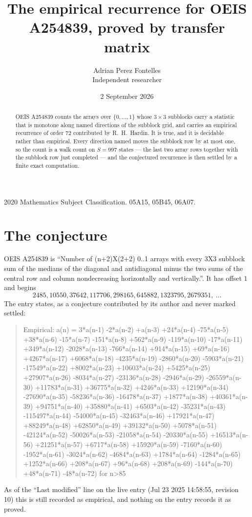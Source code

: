 \documentclass[11pt,a4paper]{article}
\title{The empirical recurrence for OEIS A254839, proved by transfer matrix}
\author{Adrian Perez Fontelles\\ \small Independent researcher}
\date{2 September 2026}
\theoremstyle{plain}
\theoremstyle{definition}
\begin{document}
\maketitle

\begin{abstract}
OEIS A254839 counts the arrays over $\{0,\dots,1\}$ whose $3\times3$ subblocks carry a
statistic that is monotone along named directions of the subblock grid, and carries an
empirical recurrence of order $72$ contributed by R.~H.~Hardin. It is true, and it is
decidable rather than empirical. Every direction named moves the subblock row by at most one,
so the count is a walk count on $S=997$ states --- the last two array rows together with the
subblock row just completed --- and the conjectured recurrence is then settled by a finite
exact computation.
\end{abstract}

\noindent\small 2020 Mathematics Subject Classification. 05A15, 05B45, 06A07.\normalsize

\section{The conjecture}

OEIS A254839 is ``Number of (n+2)X(2+2) 0..1 arrays with every 3X3 subblock sum of the medians of the diagonal and antidiagonal minus the two sums of the central row and column nondecreasing horizontally and vertically.''. It has offset $1$ and begins
\[
2485, 10550, 37642, 117706, 298165, 645882, 1323795, 2679351,\ \dots
\]
The entry states, as a conjecture contributed by its author and never marked settled:
\begin{quote}
Empirical: a(n) = 3*a(n-1) -2*a(n-2) +a(n-3) +24*a(n-4) -75*a(n-5) +38*a(n-6) -15*a(n-7) -151*a(n-8) +562*a(n-9) -119*a(n-10) -17*a(n-11) +349*a(n-12) -2028*a(n-13) -766*a(n-14) +914*a(n-15) +69*a(n-16) +4267*a(n-17) +6068*a(n-18) -4235*a(n-19) -2860*a(n-20) -5903*a(n-21) -17549*a(n-22) +8002*a(n-23) +10603*a(n-24) +5425*a(n-25) +27907*a(n-26) -8034*a(n-27) -23136*a(n-28) -2946*a(n-29) -26559*a(n-30) +11783*a(n-31) +36775*a(n-32) +4246*a(n-33) +12190*a(n-34) -27690*a(n-35) -58236*a(n-36) -16478*a(n-37) +1877*a(n-38) +40361*a(n-39) +94751*a(n-40) +35880*a(n-41) +6503*a(n-42) -35231*a(n-43) -115497*a(n-44) -54000*a(n-45) -32463*a(n-46) +17921*a(n-47) +88249*a(n-48) +62850*a(n-49) +39132*a(n-50) +5078*a(n-51) -42124*a(n-52) -50026*a(n-53) -21058*a(n-54) -20330*a(n-55) +16513*a(n-56) +21251*a(n-57) +6717*a(n-58) +15920*a(n-59) -7160*a(n-60) -1952*a(n-61) -3024*a(n-62) -4684*a(n-63) +1784*a(n-64) -1284*a(n-65) +1252*a(n-66) +208*a(n-67) +96*a(n-68) +208*a(n-69) -144*a(n-70) +48*a(n-71) -48*a(n-72) for n>85
\end{quote}
As of the ``Last modified'' line on the live entry (Jul 23 2025 14:58:55, revision 10) this is still
recorded as empirical, and nothing on the entry records it as proved.
\end{document}
